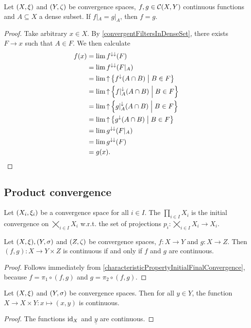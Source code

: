 \begin{lemma} \label{denseSetDeterminesContinuousFunction}
Let $\sSet{X,\xi}$ and $\sSet{Y, \zeta}$ be convergence spaces, $f,g\in \operatorname{\mathcal{C}}(X,Y)$ continuous functions and $A\subseteq X$ a dense subset. If $f|_A = g|_A$, then $f = g$.
\end{lemma}
\begin{proof}
Take arbitrary $x \in X$. By \ref{convergentFiltersInDenseSet}, there exists $F\to x$ such that $A\in F$. We then calculate
\begin{align*}
f(x) &= \lim f^{\imf\imf}(F) \\
&= \lim f^{\imf\imf}(F|_A) \\
&= \lim \upset \setbuilder{f^\imf(A\cap B)}{B\in F} \\
&= \lim \upset \setbuilder{f|_A^\imf(A\cap B)}{B\in F} \\
&= \lim \upset \setbuilder{g|_A^\imf(A\cap B)}{B\in F} \\
&= \lim \upset \setbuilder{g^\imf(A\cap B)}{B\in F} \\
&= \lim g^{\imf\imf}(F|_A) \\
&= \lim g^{\imf\imf}(F) \\
&= g(x).
\end{align*}
\end{proof}

\subsection{Product convergence}
\begin{definition}
Let $\sSet{X_i, \xi_i}$ be a convergence space for all $i\in I$. The  $\prod_{i\in I}X_i$ is the initial convergence on $\bigtimes_{i\in I}X_i$ w.r.t. the set of projections $p_i: \bigtimes_{i\in I}X_i \to X_i$.
\end{definition}

\begin{lemma} \label{continuityFunctionTuple}
Let $\sSet{X,\xi}, \sSet{Y,\sigma}$ and $\sSet{Z,\zeta}$ be convergence spaces, $f: X\to Y$ and $g: X\to Z$. Then $(f,g): X\to Y\times Z$ is continuous \textup{if and only if} $f$ and $g$ are continuous.
\end{lemma}
\begin{proof}
Follows immediately from \ref{characteristicPropertyInitialFinalConvergence},
because $f = \pi_1\circ (f,g)$ and $g = \pi_2\circ (f,g)$.
\end{proof}
\begin{corollary} \label{continuousEmbeddingProduct}
Let $\sSet{X,\xi}$ and $\sSet{Y,\sigma}$ be convergence spaces. Then for all $y\in Y$, the function $X\to X\times Y: x\mapsto (x,y)$ is continuous.
\end{corollary}
\begin{proof}
The functions $\operatorname{id}_X$ and $\underline{y}$ are continuous.
\end{proof}

